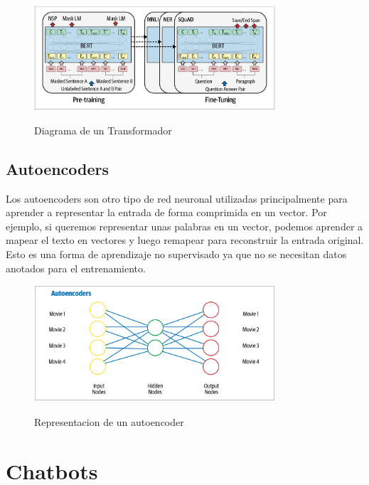 \begin{figure}[H]
	\centering
	\includegraphics[width=0.8\textwidth]{imagenes/Cap 2/tranformers.png}
	\caption{Diagrama de un Transformador}
	\label{fig:RNN}
	\cite{sowmya_practical_npl}
\end{figure}

\subsection{Autoencoders}
Los autoencoders son otro tipo de red neuronal utilizadas principalmente para aprender a
representar la
entrada de forma comprimida en un vector. Por ejemplo, si queremos representar unas palabras en un
vector,
podemos aprender a mapear el texto en vectores y luego remapear para reconstruir la entrada
original.
Esto es una forma de aprendizaje no supervisado ya que no se necesitan datos anotados para el
entrenamiento.\\

\begin{figure}[H]
	\centering
	\includegraphics[width=0.8\textwidth]{imagenes/Cap 2/autoencoder.png}
	\caption{Representacion de un autoencoder}
	\label{fig:autoencoder}
	\cite{sowmya_practical_npl}
\end{figure}



\section{Chatbots}

